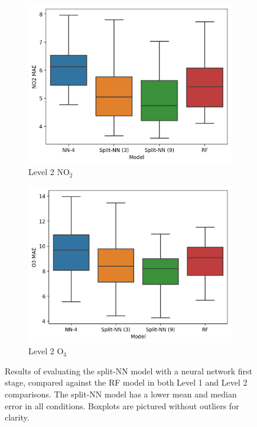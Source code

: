 \documentclass[journal abbreviation, manuscript]{copernicus}
\newcommand{\textus}[1]{$_{\text{#1}}$}
\begin{document}
\begin{figure}[H]
\begin{subfigure}{0.35\textwidth}
\includegraphics[width=\textwidth]{results/split-no2-location-level2-big-mae}
\caption{Level 2 NO\textus{2}}
\end{subfigure}
\begin{subfigure}{0.35\textwidth}
\includegraphics[width=\textwidth]{results/split-o3-location-level2-big-mae}
\caption{Level 2 O\textus{3}}
\end{subfigure}
\caption{Results of evaluating the split-NN model with a neural network first stage, compared against the RF model in both Level 1 and Level 2 comparisons. The split-NN model has a lower mean and median error in all conditions. Boxplots are pictured without outliers for clarity.}
\label{fig:split-results-nnfe}
\end{figure}
\fi
\end{document}
